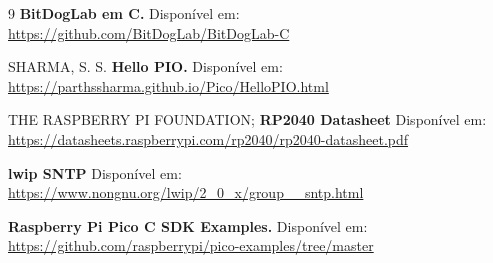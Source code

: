 \documentclass[12pt]{article}
\begin{document}
\begin{thebibliography}{9}
    \textbf{BitDogLab em C.}
    Disponível em: \url{https://github.com/BitDogLab/BitDogLab-C}

    SHARMA, S. S.
    \textbf{Hello PIO.}
    Disponível em: \url{https://parthssharma.github.io/Pico/HelloPIO.html}

    THE RASPBERRY PI FOUNDATION;
    \textbf{RP2040 Datasheet}
    Disponível em: \url{https://datasheets.raspberrypi.com/rp2040/rp2040-datasheet.pdf}

    \textbf{lwip SNTP}
    Disponível em: \url{https://www.nongnu.org/lwip/2_0_x/group__sntp.html}

    \textbf{Raspberry Pi Pico C SDK Examples.}
    Disponível em: \url{https://github.com/raspberrypi/pico-examples/tree/master}

    \end{thebibliography}
\end{document}
